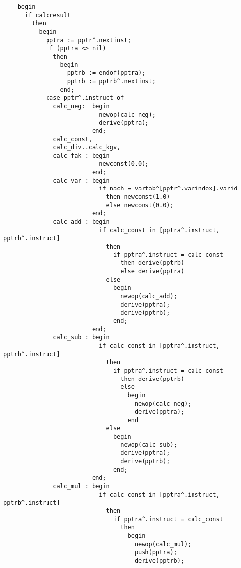 \begin{refsection}
\begin{lstlisting}
    begin
      if calcresult
        then
          begin
            pptra := pptr^.nextinst;
            if (pptra <> nil)
              then
                begin
                  pptrb := endof(pptra);
                  pptrb := pptrb^.nextinst;
                end;
            case pptr^.instruct of
              calc_neg:  begin
                           newop(calc_neg);
                           derive(pptra);
                         end;
              calc_const,
              calc_div..calc_kgv,
              calc_fak : begin
                           newconst(0.0);
                         end;
              calc_var : begin
                           if nach = vartab^[pptr^.varindex].varid
                             then newconst(1.0)
                             else newconst(0.0);
                         end;
              calc_add : begin
                           if calc_const in [pptra^.instruct, pptrb^.instruct]
                             then
                               if pptra^.instruct = calc_const
                                 then derive(pptrb)
                                 else derive(pptra)
                             else
                               begin
                                 newop(calc_add);
                                 derive(pptra);
                                 derive(pptrb);
                               end;
                         end;
              calc_sub : begin
                           if calc_const in [pptra^.instruct, pptrb^.instruct]
                             then
                               if pptra^.instruct = calc_const
                                 then derive(pptrb)
                                 else
                                   begin
                                     newop(calc_neg);
                                     derive(pptra);
                                   end
                             else
                               begin
                                 newop(calc_sub);
                                 derive(pptra);
                                 derive(pptrb);
                               end;
                         end;
              calc_mul : begin
                           if calc_const in [pptra^.instruct, pptrb^.instruct]
                             then
                               if pptra^.instruct = calc_const
                                 then
                                   begin
                                     newop(calc_mul);
                                     push(pptra);
                                     derive(pptrb);

\end{lstlisting}
\end{refsection}
